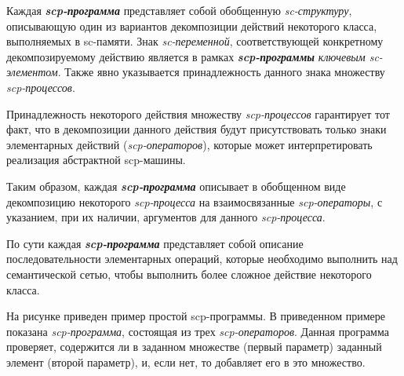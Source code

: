 \begin{SCn}
\end{SCn}

Каждая \textbf{\textit{scp-программа}} представляет собой обобщенную \textit{sc-структуру}, описывающую один из вариантов декомпозиции действий некоторого класса, выполняемых в sc-памяти. Знак \textit{sc-переменной}, соответствующей конкретному декомпозируемому действию является в рамках \textbf{\textit{scp-программы}} \textit{ключевым sc-элементом\scnrolesign}. Также явно указывается принадлежность данного знака множеству \textit{scp-процессов}.
	
Принадлежность некоторого действия множеству \textit{scp-процессов} гарантирует тот факт, что в декомпозиции данного действия будут присутствовать только знаки элементарных действий (\textit{scp-операторов}), которые может интерпретировать реализация абстрактной scp-машины.

Таким образом, каждая \textbf{\textit{scp-программа}} описывает в обобщенном виде декомпозицию некоторого \textit{\mbox{scp-процесса}} на взаимосвязанные \textit{scp-операторы}, с указанием, при их наличии, аргументов для данного \textit{scp-процесса}.

По сути каждая \textbf{\textit{scp-программа}} представляет собой описание последовательности элементарных операций, которые необходимо выполнить над семантической сетью, чтобы выполнить более сложное действие некоторого класса.

На рисунке \textit{} приведен пример простой scp-программы. В приведенном примере показана \textit{scp-программа}, состоящая из трех \textit{scp-операторов}. Данная программа проверяет, содержится ли в заданном множестве (первый параметр) заданный элемент (второй параметр), и, если нет, то добавляет его в это множество.
	
